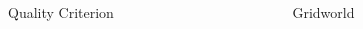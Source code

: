 \documentclass[xcolor=x11names,12pt]{beamer}
\begin{document}
\begin{frame}
\begin{columns}
\begin{column}{.48\textwidth}
    \end{column}
  \end{columns}
\vfill
  \begin{columns}
    \begin{column}{.48\textwidth}
      \begin{block}{Quality Criterion}
        \centering
        \fontsize{11pt}{11pt}\selectfont
      \end{block}
    \end{column}
    \begin{column}{.48\textwidth}
      \begin{block}{Gridworld}
        \centering
        \fontsize{11pt}{11pt}\selectfont

\end{block}
\end{column}
\end{columns}
\end{frame}
\end{document}
